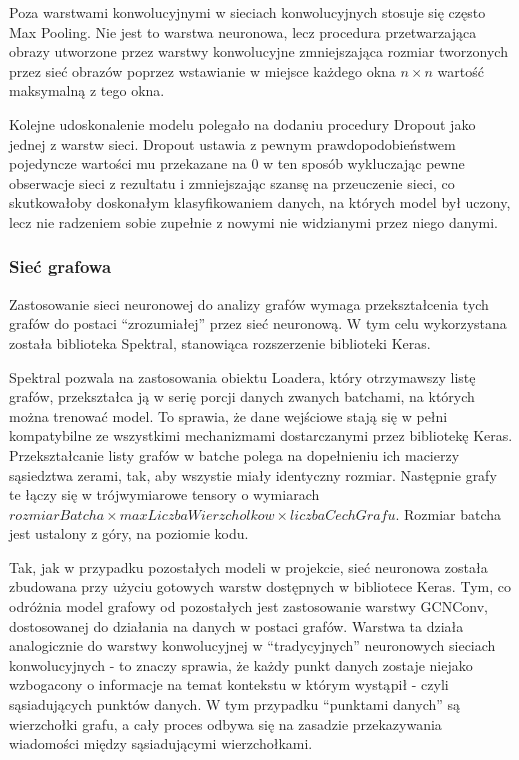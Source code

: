 \documentclass{article}
\begin{document}
Poza warstwami konwolucyjnymi w sieciach konwolucyjnych stosuje się 
często Max Pooling. Nie jest to warstwa neuronowa, lecz procedura 
przetwarzająca obrazy utworzone przez warstwy konwolucyjne zmniejszająca 
rozmiar tworzonych przez sieć obrazów poprzez wstawianie w miejsce każdego 
okna $n \times n$ wartość maksymalną z tego okna.

Kolejne udoskonalenie modelu polegało na dodaniu procedury Dropout jako 
jednej z warstw sieci. Dropout ustawia z pewnym prawdopodobieństwem pojedyncze 
wartości mu przekazane na 0 w ten sposób wykluczając pewne obserwacje sieci z 
rezultatu i zmniejszając szansę na przeuczenie sieci, co skutkowałoby doskonałym 
klasyfikowaniem danych, na których model był uczony, lecz nie radzeniem sobie 
zupełnie z nowymi nie widzianymi przez niego danymi.
\subsubsection{Sieć grafowa}
Zastosowanie sieci neuronowej do analizy grafów wymaga przekształcenia
tych grafów do postaci “zrozumiałej” przez sieć neuronową. W tym celu
wykorzystana została biblioteka Spektral, stanowiąca rozszerzenie 
biblioteki Keras.

Spektral pozwala na zastosowania obiektu Loadera, który otrzymawszy listę
grafów, przekształca ją w serię porcji danych zwanych batchami, na których
można trenować model. To sprawia, że dane wejściowe stają się w pełni
kompatybilne ze wszystkimi mechanizmami dostarczanymi przez bibliotekę
Keras.
Przekształcanie listy grafów w batche polega na dopełnieniu ich macierzy
sąsiedztwa zerami, tak, aby wszystie miały identyczny rozmiar. 
Następnie grafy te łączy się w trójwymiarowe tensory o wymiarach 
$rozmiarBatcha \times maxLiczbaWierzcholkow \times liczbaCechGrafu$. Rozmiar batcha 
jest ustalony z góry, na poziomie kodu.

Tak, jak w przypadku pozostałych modeli w projekcie, sieć neuronowa została 
zbudowana przy użyciu gotowych warstw dostępnych w bibliotece Keras. Tym, co 
odróżnia model grafowy od pozostałych jest zastosowanie warstwy GCNConv, 
dostosowanej do działania na danych w postaci grafów.
Warstwa ta działa analogicznie do warstwy konwolucyjnej w “tradycyjnych” 
neuronowych sieciach konwolucyjnych - to znaczy sprawia, że każdy punkt 
danych zostaje niejako wzbogacony o informacje na temat kontekstu w którym 
wystąpił - czyli sąsiadujących punktów danych. W tym przypadku “punktami 
danych” są wierzchołki grafu, a cały proces odbywa się na zasadzie przekazywania 
wiadomości między sąsiadującymi wierzchołkami.
\end{document}
